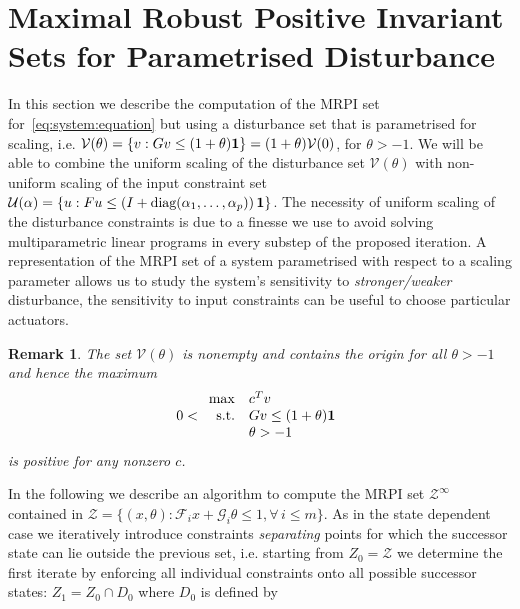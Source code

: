 \documentclass[letterpaper, 10pt, conference]{ieeeconf} %
\newtheorem{rem}[thm]{Remark}
\begin{document}
\section{Maximal Robust Positive Invariant Sets for Parametrised Disturbance}\label{sec:MRPI:parametrised}
%
%
In this section we describe the computation of the MRPI set for~\eqref{eq:system:equation}
but using a disturbance set that is parametrised for scaling, i.e. $\mathcal V(\theta) = \{v: Gv\leq(1+\theta){\bf{1}}\} 
= (1+\theta)\mathcal V(0)$, for $\theta>-1$. We will be able to combine the uniform scaling of 
the disturbance set $\mathcal V(\theta)$ with non-uniform scaling of the input constraint set
$\mathcal U({\bf{\alpha}}) = \{u: Fu\leq\left(I+\text{diag}(\alpha_1,\dots,\alpha_p)\right){\bf{1}}\}$.
The necessity of uniform scaling of the disturbance constraints is due to a finesse we use to avoid
solving multiparametric linear programs in every substep of the proposed iteration.
A representation of the MRPI set of a system parametrised with respect to a scaling parameter allows us
to study the system's sensitivity to \emph{stronger/weaker} disturbance, the sensitivity to input 
constraints can be useful to choose particular actuators.
%
\begin{rem}
The set $\mathcal V(\theta)$ is nonempty and contains the origin for all $\theta>-1$ and hence the 
maximum
%
\[
0<\begin{array}{rl}
\max & c^T v\\
\text{s.t.}& Gv \leq (1+\theta){\bf{1}}\\
&\theta>-1
\end{array}
\]
%
is positive for any nonzero $c$.
\end{rem}
%
In the following we describe an algorithm to compute the MRPI set $\mathcal Z^\infty$ contained in 
$\mathcal Z = \{(x,\theta):\mathcal F_i x+\mathcal G_i\theta \leq 1,\forall\, i\leq m\}$.
As in the state dependent case we iteratively introduce constraints \emph{separating} points
for which the successor state can lie outside the previous set, i.e. starting from $Z_0 = \mathcal Z$
we determine the first iterate by enforcing all individual constraints onto all possible successor states:
$Z_1=Z_0\cap D_0$ where $D_0$ is defined by
%
\end{document}
